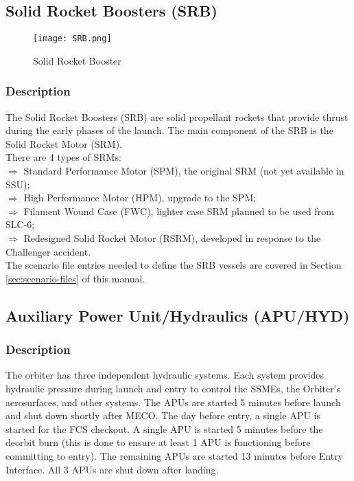 \documentclass[Space_Shuttle_Ultra_Manual.tex]{subfiles}
\begin{document}
\subsection{Solid Rocket Boosters (SRB)}
\begin{figure}[b!]
  \texttt{[image: SRB.png]}
  \caption{Solid Rocket Booster}
  \label{fig:SRB}
\end{figure}
\begin{multicols*}{2}
\renewcommand{\cfttoctitlefont}{\bf}
\localtableofcontents
\subsubsection{Description}
The Solid Rocket Boosters (SRB) are solid propellant rockets that provide thrust during the early phases of the launch. The main component of the SRB is the Solid Rocket Motor (SRM).\\
There are 4 types of SRMs$\colon$\\
$\Rightarrow$ Standard Performance Motor (SPM), the original SRM (not yet available in SSU);\\
$\Rightarrow$ High Performance Motor (HPM), upgrade to the SPM;\\
$\Rightarrow$ Filament Wound Case (FWC), lighter case SRM planned to be used from SLC-6;\\
$\Rightarrow$ Redesigned Solid Rocket Motor (RSRM), developed in response to the Challenger accident.\\
The scenario file entries needed to define the SRB vessels are covered in Section \ref{sec:scenario-files} of this manual.
\end{multicols*}

\subsection{Auxiliary Power Unit/Hydraulics (APU/HYD)}
\begin{multicols*}{2}
\renewcommand{\cfttoctitlefont}{\bf}
\localtableofcontents
\subsubsection{Description}
The orbiter has three independent hydraulic systems. Each system provides hydraulic pressure during launch and entry to control the SSMEs, the Orbiter's aerosurfaces, and other systems.
The APUs are started 5 minutes before launch and shut down shortly after MECO.
The day before entry, a single APU is started for the FCS checkout.
A single APU is started 5 minutes before the deorbit burn (this is done to ensure at least 1 APU is functioning before committing to entry). The remaining APUs are started 13 minutes before Entry Interface.
All 3 APUs are shut down after landing.
\end{multicols*}
\end{document}

